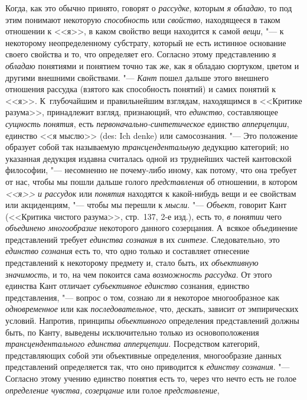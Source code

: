 Когда, как это обычно принято, говорят о {\em рассудке}, которым
{\em я обладаю}, то под этим понимают некоторую {\em способность} или
{\em свойство}, находящееся в таком отношении к <<я>>, в каком свойство вещи
находится к самой {\em вещи}, "--- к некоторому неопределенному субстрату,
который не есть истинное основание
своего свойства и то, что определяет его. Согласно этому представлению я
{\em обладаю} понятиями и понятием точно так же, как я обладаю сюртуком,
цветом и другими внешними свойствами. "--- {\em Кант} пошел дальше этого
внешнего отношения рассудка (взятого как способность понятий) и самих
понятий к <<я>>. К~глубочайшим и правильнейшим взглядам, находящимся в
<<Критике разума>>, принадлежит взгляд, признающий, что {\em единство},
составляющее {\em сущность понятия}, есть {\em первоначально-синтетическое}
единство {\em апперцепции}, единство <<я мыслю>> (des: Ich denke) или
самосознания. "---
Это положение образует собой так называемую {\em трансцендентальную} дедукцию
категорий; но указанная дедукция издавна считалась одной из труднейших
частей кантовской философии, "--- несомненно не почему-либо иному, как потому,
что она требует от нас, чтобы мы пошли дальше голого {\em представления} об
отношении, в котором {\em <<я>> и рассудок} или {\em понятия} находятся к
какой-нибудь вещи и ее свойствам или акциденциям, "--- чтобы мы перешли к
{\em мысли}. "--- {\em Объект}, говорит Кант (<<Критика чистого разума>>,
стр.~137, 2-е изд.), есть то, {\em в понятии} чего {\em объединено многообразие}
некоторого данного созерцания. А~всякое объединение представлений требует
{\em единства сознания} в их {\em синтезе}. Следовательно, это {\em единство сознания}
есть то, что одно только и составляет отнесение представлений к некоторому
предмету и, стало быть, их {\em объективную значимость}, и то, на чем покоится
сама {\em возможность рассудка}. От этого единства Кант отличает
{\em субъективное единство} сознания, единство представления, "--- вопрос о том,
сознаю ли я некоторое многообразное как {\em одновременное} или как
{\em последовательное}, что, дескать, зависит от эмпирических условий.
Напротив, принципы {\em объективного} определения представлений должны быть,
по Канту, выведены исключительно только из основоположения
{\em трансцендентального единства апперцепции}. Посредством категорий,
представляющих собой эти объективные определения, многообразие данных
представлений определяется так, что оно приводится к {\em единству сознания}.
"--- Согласно этому учению единство понятия есть то, через что нечто есть не
голое {\em определение чувства, созерцание} или голое {\em представление},

